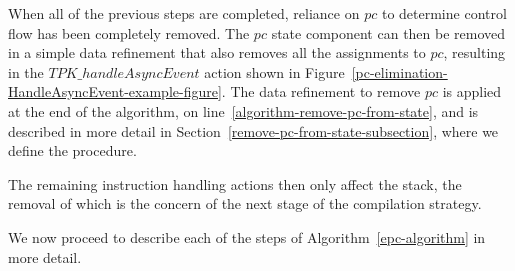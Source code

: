 When all of the previous steps are completed, reliance on $pc$ to
determine control flow has been completely removed.
The $pc$ state component can then be removed in a simple data
refinement that also removes all the assignments to $pc$, resulting in
the $TPK\_handleAsyncEvent$ action shown in
Figure~\ref{pc-elimination-HandleAsyncEvent-example-figure}.
The data refinement to remove $pc$ is applied at the end of the
algorithm, on line~\ref{algorithm-remove-pc-from-state}, and is
described in more detail in
Section~\ref{remove-pc-from-state-subsection}, where we define the
 procedure.

The remaining instruction handling actions then only affect the stack,
the removal of which is the concern of the next stage of the
compilation strategy.

We now proceed to describe each of the steps of
Algorithm~\ref{epc-algorithm} in more detail.
